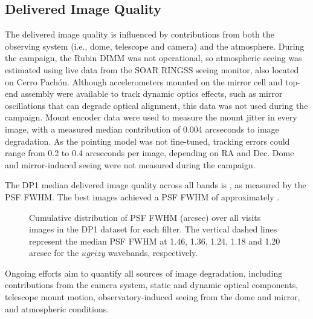 \subsection{Delivered Image Quality}
\label{ssec:image_quality}
The delivered image quality is influenced by contributions from both the observing system (i.e., dome, telescope and camera) and the atmosphere.
During the campaign, the Rubin \gls{DIMM} was not operational, so atmospheric seeing was estimated using live data from the \gls{SOAR} \gls{RINGSS} seeing monitor, also located on Cerro Pach\'on.
Although accelerometers mounted on the mirror cell and top-end assembly were available to track dynamic optics effects, such as mirror oscillations that can degrade optical alignment, this data was not used during the campaign.
Mount encoder data were used to measure the mount jitter in every image, with a measured median contribution of 0.004 arcseconds to image degradation.
As the pointing model was not fine-tuned, tracking errors could range from 0.2 to 0.4 arcseconds per image, depending on RA and Dec.
Dome and mirror-induced \gls{seeing} were not measured during the campaign.

% 
The DP1 median delivered image quality across all bands is \medianimagequalityallbands, as measured by the \gls{PSF} \gls{FWHM}.
The best images achieved a \gls{PSF} \gls{FWHM} of approximately \bestimagequality.
\begin{figure}[htb!]
\centering
{}
\caption{Cumulative distribution of PSF FWHM (arcsec) over all \nvisitdetectorsummaries visits images in the DP1 dataset for each filter.
The vertical dashed lines represent the median PSF FWHM at 1.46, 1.36, 1.24, 1.18 and 1.20 arcsec for the $ugrizy$ wavebands, respectively.}
\label{fig:delivered_image_quality_ecdf}
\end{figure}
Ongoing efforts aim to quantify all sources of image degradation,  including contributions from the camera system, static and dynamic optical components, telescope mount motion,  observatory-induced seeing from the dome and mirror, and atmospheric conditions.

